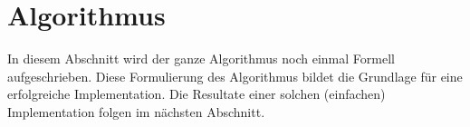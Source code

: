 \section{Algorithmus\label{cg:section:voraussetzungen}}

In diesem Abschnitt wird der ganze Algorithmus noch einmal Formell aufgeschrieben.
Diese Formulierung des Algorithmus bildet die Grundlage für eine erfolgreiche Implementation.
Die Resultate einer solchen (einfachen) Implementation folgen im nächsten Abschnitt.

